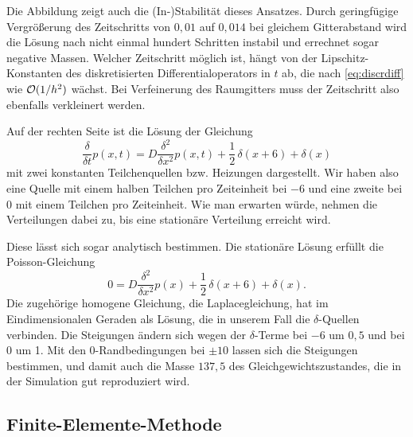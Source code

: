 %

Die Abbildung zeigt auch die (In-)Stabilität dieses Ansatzes. Durch
geringfügige Vergrößerung des Zeitschritts von $0,01$ auf $0,014$ bei
gleichem Gitterabstand wird die Lösung nach nicht einmal hundert
Schritten instabil und errechnet sogar negative Massen. Welcher Zeitschritt
möglich ist, hängt von der Lipschitz-Konstanten des diskretisierten
Differentialoperators in $t$ ab, die nach \eqref{eq:discrdiff} wie $\mathcal O(1/h^2)$ wächst.
Bei Verfeinerung des Raumgitters muss der Zeitschritt also ebenfalls verkleinert
werden.

Auf der rechten Seite ist die Lösung der Gleichung
\begin{equation}
  \frac{\delta}{\delta t} p(x, t) =
  D\frac{\delta^2}{\delta x^2} p(x, t)
  + \frac{1}{2}\,\delta\left(x + 6\right) + \delta(x)
\end{equation}
mit zwei konstanten Teilchenquellen bzw. Heizungen dargestellt. Wir
haben also eine Quelle mit einem halben Teilchen pro Zeiteinheit bei
$-6$ und eine zweite bei $0$ mit einem Teilchen pro
Zeiteinheit. Wie man erwarten würde, nehmen die Verteilungen dabei zu,
bis eine stationäre Verteilung erreicht wird.

Diese lässt sich sogar analytisch bestimmen. Die stationäre Lösung
erfüllt die Poisson-Gleichung
\begin{equation}
  0 = D\frac{\delta^2}{\delta x^2} p(x) +
  \frac{1}{2}\,\delta\left(x+6\right) + \delta(x).
\end{equation}
Die zugehörige homogene Gleichung, die Laplacegleichung, hat im Eindimensionalen Geraden
als Lösung, die in unserem Fall die $\delta$-Quellen verbinden. Die Steigungen ändern
sich wegen der $\delta$-Terme bei $-6$ um $0,5$ und bei 0 um 1. Mit
den 0-Randbedingungen bei $\pm 10$ lassen sich die Steigungen
bestimmen, und damit auch die Masse $137,5$ des
Gleichgewichtszustandes, die in der Simulation gut reproduziert wird.

\subsection{Finite-Elemente-Methode}

